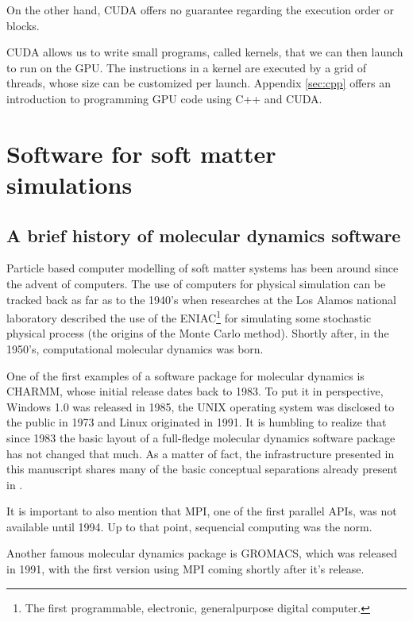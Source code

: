 \documentclass[ twoside,openright,titlepage,numbers=noenddot,%
headinclude,footinclude,cleardoublepage=empty,abstract=on,
BCOR=5mm,paper=a4,fontsize=11pt, dvipsnames
]{scrreprt}
\newcommand{\gpu}{\gls{GPU}\xspace}
\begin{document}
On the other hand, CUDA offers no guarantee regarding the execution order or blocks.



CUDA allows us to write small programs, called kernels, that we can then launch to run on the \gpu. The instructions in a kernel are executed by a grid of threads, whose size can be customized per launch. Appendix \ref{sec:cpp} offers an introduction to programming GPU code using C++ and CUDA.

\section{Software for soft matter simulations}

\subsection*{A brief history of molecular dynamics software}
Particle based computer modelling of soft matter systems has been around since the advent of computers. The use of computers for physical simulation can be tracked back as far as to the 1940's when researches at the Los Alamos national laboratory described the use of the ENIAC\footnote{The first programmable, electronic, generalpurpose digital computer.} for simulating some stochastic physical process\cite{Hurd1985} (the origins of the Monte Carlo method\cite{Johansen2010}). Shortly after, in the 1950's, computational molecular dynamics was born\cite{DeTullio2016}.

One of the first examples of a software package for molecular dynamics is CHARMM, whose initial release dates back to 1983\cite{Brooks1983}. To put it in perspective, Windows 1.0 was released in 1985, the UNIX operating system was disclosed to the public in 1973 and Linux originated in 1991. It is humbling to realize that since 1983 the basic layout of a full-fledge molecular dynamics software package has not changed that much. As a matter of fact, the infrastructure presented in this manuscript shares many of the basic conceptual separations already present in \cite{Brooks1983}.

It is important to also mention that MPI, one of the first parallel \glspl{API}, was not available until 1994. Up to that point, sequencial computing was the norm.

Another famous molecular dynamics package is GROMACS, which was released in 1991, with the first version using MPI coming shortly after it's release.
\end{document}
